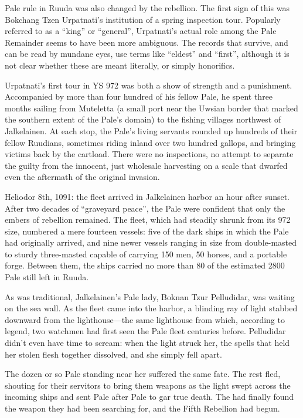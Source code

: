 \documentclass[12pt]{report}
\begin{document}
Pale rule in Ruuda was also changed by the rebellion.  The first sign
of this was Bokchang Tzen Urpatnati's institution of a spring
inspection tour.  Popularly referred to as a ``king'' or ``general'',
Urpatnati's actual role among the Pale Remainder seems to have been
more ambiguous.  The records that survive, and can be read by mundane
eyes, use terms like ``eldest'' and ``first'', although it is not clear
whether these are meant literally, or simply honorifics.

Urpatnati's first tour in YS 972 was both a show of strength and a
punishment.  Accompanied by more than four hundred of his fellow Pale,
he spent three months sailing from Muteletta (a small port near the
Uwsian border that marked the southern extent of the Pale's domain) to
the fishing villages northwest of Jalkelainen.  At each stop, the
Pale's living servants rounded up hundreds of their fellow Ruudians,
sometimes riding inland over two hundred gallops, and bringing victims
back by the cartload.  There were no inspections, no attempt to
separate the guilty from the innocent, just wholesale harvesting on a
scale that dwarfed even the aftermath of the original invasion.

Heliodor 8th, 1091: the fleet arrived in Jalkelainen harbor an hour
after sunset.  After two decades of ``graveyard peace'', the Pale were
confident that only the embers of rebellion remained.  The fleet,
which had steadily shrunk from its 972 size, numbered a mere fourteen
vessels: five of the dark ships in which the Pale had originally
arrived, and nine newer vessels ranging in size from double-masted
 to sturdy three-masted  capable of carrying
150 men, 50 horses, and a portable forge.  Between them, the ships
carried no more than 80 of the estimated 2800 Pale still left in
Ruuda.

As was traditional, Jalkelainen's Pale lady, Boknan Tzur Pelludidar,
was waiting on the sea wall.  As the fleet came into the harbor, a
blinding ray of light stabbed downward from the lighthouse---the same
lighthouse from which, according to legend, two watchmen had first
seen the Pale fleet centuries before.  Pelludidar didn't even have
time to scream: when the light struck her, the spells that held her
stolen flesh together dissolved, and she simply fell apart.

The dozen or so Pale standing near her suffered the same fate.  The
rest fled, shouting for their servitors to bring them weapons as the
light swept across the incoming ships and sent Pale after Pale to gar
true death.  The {\aemott} had finally found the weapon they had been
searching for, and the Fifth Rebellion had begun.
\end{document}
